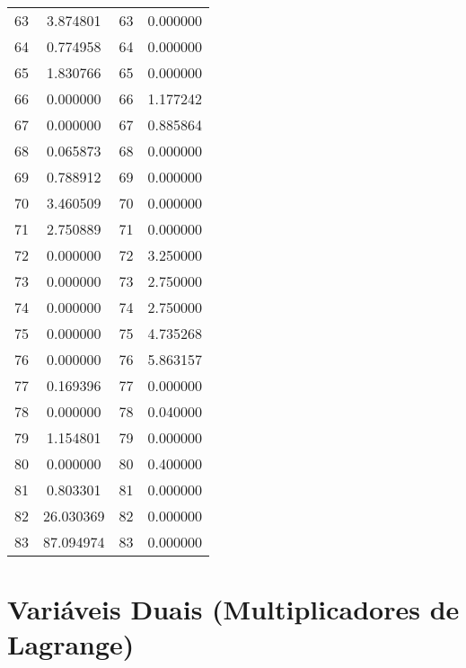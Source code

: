 \documentclass[12pt]{article}
\begin{document}
\begin{longtable}{@{}cccc@{}}
63 & 3.874801 & 63 & 0.000000 \\
64 & 0.774958 & 64 & 0.000000 \\
65 & 1.830766 & 65 & 0.000000 \\
66 & 0.000000 & 66 & 1.177242 \\
67 & 0.000000 & 67 & 0.885864 \\
68 & 0.065873 & 68 & 0.000000 \\
69 & 0.788912 & 69 & 0.000000 \\
70 & 3.460509 & 70 & 0.000000 \\
71 & 2.750889 & 71 & 0.000000 \\
72 & 0.000000 & 72 & 3.250000 \\
73 & 0.000000 & 73 & 2.750000 \\
74 & 0.000000 & 74 & 2.750000 \\
75 & 0.000000 & 75 & 4.735268 \\
76 & 0.000000 & 76 & 5.863157 \\
77 & 0.169396 & 77 & 0.000000 \\
78 & 0.000000 & 78 & 0.040000 \\
79 & 1.154801 & 79 & 0.000000 \\
80 & 0.000000 & 80 & 0.400000 \\
81 & 0.803301 & 81 & 0.000000 \\
82 & 26.030369 & 82 & 0.000000 \\
83 & 87.094974 & 83 & 0.000000 \\

\end{longtable}

\section{Variáveis Duais (Multiplicadores de Lagrange)}
\end{document}
